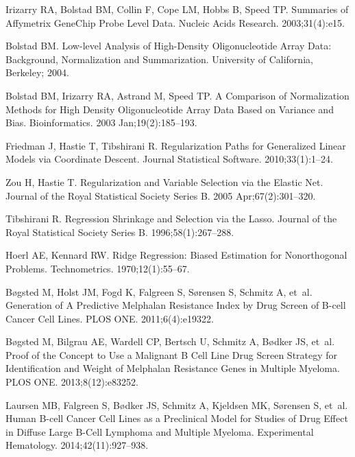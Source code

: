 \documentclass[10pt,letterpaper]{article}
\begin{document}
\begin{thebibliography}{10}
Irizarry RA, Bolstad BM, Collin F, Cope LM, Hobbs B, Speed TP.
\newblock Summaries of {Affymetrix GeneChip} Probe Level Data.
\newblock Nucleic Acids Research. 2003;31(4):e15.

Bolstad BM.
\newblock Low-level Analysis of High-Density Oligonucleotide Array Data:
  Background, Normalization and Summarization.
\newblock University of California, Berkeley; 2004.

Bolstad BM, Irizarry RA, Astrand M, Speed TP.
\newblock A Comparison of Normalization Methods for High Density
  Oligonucleotide Array Data Based on Variance and Bias.
\newblock Bioinformatics. 2003 Jan;19(2):185--193.

Friedman J, Hastie T, Tibshirani R.
\newblock Regularization Paths for Generalized Linear Models via Coordinate
  Descent.
\newblock Journal Statistical Software. 2010;33(1):1--24.

Zou H, Hastie T.
\newblock Regularization and Variable Selection via the Elastic Net.
\newblock Journal of the Royal Statistical Society Series B. 2005
  Apr;67(2):301--320.

Tibshirani R.
\newblock Regression Shrinkage and Selection via the Lasso.
\newblock Journal of the Royal Statistical Society Series B.
  1996;58(1):267--288.

Hoerl AE, Kennard RW.
\newblock Ridge Regression: Biased Estimation for Nonorthogonal Problems.
\newblock Technometrics. 1970;12(1):55--67.

B{\o}gsted M, Holst JM, Fogd K, Falgreen S, S{\o}rensen S, Schmitz A, et~al.
\newblock Generation of A Predictive Melphalan Resistance Index by Drug Screen
  of {B}-cell Cancer Cell Lines.
\newblock PLOS ONE. 2011;6(4):e19322.

B{\o}gsted M, Bilgrau AE, Wardell CP, Bertsch U, Schmitz A, B{\o}dker JS,
  et~al.
\newblock Proof of the Concept to Use a Malignant {B} Cell Line Drug Screen
  Strategy for Identification and Weight of Melphalan Resistance Genes in
  Multiple Myeloma.
\newblock PLOS ONE. 2013;8(12):e83252.

Laursen MB, Falgreen S, B{\o}dker JS, Schmitz A, Kjeldsen MK, S{\o}rensen S,
  et~al.
\newblock Human {B}-cell Cancer Cell Lines as a Preclinical Model for Studies
  of Drug Effect in Diffuse Large {B}-Cell Lymphoma and Multiple Myeloma.
\newblock Experimental Hematology. 2014;42(11):927--938.


\end{thebibliography}
\end{document}

